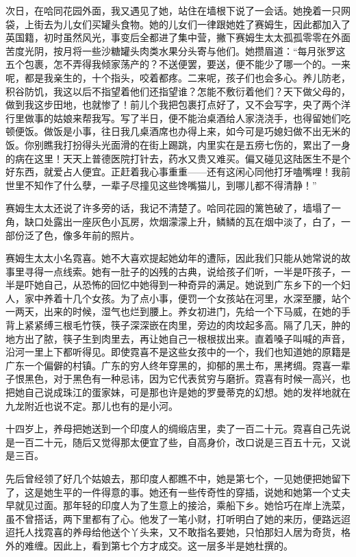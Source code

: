 \par 次日，在哈同花园外面，我又遇见了她，站住在墙根下说了一会话。她挽着一只网袋，上街去为儿女们买罐头食物。她的儿女们一律跟她姓了赛姆生，因此都加入了英国籍，初时虽然风光，事变后全都进了集中营，撇下赛姆生太太孤孤零零在外面苦度光阴，按月将一些沙糖罐头肉类水果分头寄与他们。她攒眉道：“每月张罗这五个包裹，怎不弄得我倾家荡产的？不送便罢，要送，便不能少了哪一个的。一来呢，都是我亲生的，十个指头，咬着都疼。二来呢，孩子们也会多心。养儿防老，积谷防饥，我这以后不指望着他们还指望谁？怎能不敷衍着他们？天下做父母的，做到我这步田地，也就惨了！前儿个我把包裹打点好了，又不会写字，央了两个洋行里做事的姑娘来帮我写。写了半日，便不能治桌酒给人家浇浇手，也得留她们吃顿便饭。做饭是小事，往日我几桌酒席也办得上来，如今可是巧媳妇做不出无米的饭。你别瞧我打扮得头光面滑的在街上踢跳，内里实在是五痨七伤的，累出了一身的病在这里！天天上普德医院打针去，药水又贵又难买。偏又碰见这陆医生不是个好东西，就爱占人便宜。正赶着我心事重重——还有这闲心同他打牙嗑嘴哩！我前世里不知作了什么孽，一辈子尽撞见这些馋嘴猫儿，到哪儿都不得清静！”
\par 赛姆生太太还说了许多旁的话，我记不清楚了。哈同花园的篱笆破了，墙塌了一角，缺口处露出一座灰色小瓦房，炊烟濛濛上升，鳞鳞的瓦在烟中淡了，白了，一部份泛了色，像多年前的照片。
\par 赛姆生太太小名霓喜。她不大喜欢提起她幼年的遭际，因此我们只能从她常说的故事里寻得一点线索。她有一肚子的凶残的古典，说给孩子们听，一半是吓孩子，一半是吓她自己，从恐怖的回忆中她得到一种奇异的满足。她说到广东乡下的一个妇人，家中养着十几个女孩。为了点小事，便罚一个女孩站在河里，水深至腰，站个一两天，出来的时候，湿气也烂到腰上。养女初进门，先给一个下马威，在她的手背上紧紧缚三根毛竹筷，筷子深深嵌在肉里，旁边的肉坟起多高。隔了几天，肿的地方出了脓，筷子生到肉里去，再让她自己一根根拔出来。直着嗓子叫喊的声音，沿河一里上下都听得见。即使霓喜不是这些女孩中的一个，我们也知道她的原籍是广东一个偏僻的村镇。广东的穷人终年穿黑的，抑郁的黑土布，黑拷绸。霓喜一辈子恨黑色，对于黑色有一种忌讳，因为它代表贫穷与磨折。霓喜有时候一高兴，也把她自己说成珠江的蛋家妹，可是那也许是她的罗曼蒂克的幻想。她的发祥地就在九龙附近也说不定。那儿也有的是小河。
\par 十四岁上，养母把她送到一个印度人的绸缎店里，卖了一百二十元。霓喜自己先说是一百二十元，随后又觉得那太便宜了些，自高身价，改口说是三百五十元，又说是三百。
\par 先后曾经领了好几个姑娘去，那印度人都瞧不中，她是第七个，一见她便把她留下了，这是她生平的一件得意的事。她还有一些传奇性的穿插，说她和她第一个丈夫早就见过面。那年轻的印度人为了生意上的接洽，乘船下乡。她恰巧在岸上洗菜，虽不曾搭话，两下里都有了心。他发了一笔小财，打听明白了她的来历，便路远迢迢托人找霓喜的养母给他送个丫头来，又不敢指名要她，只怕那妇人居为奇货，格外的难缠。因此上，看到第七个方才成交。这一层多半是她杜撰的。
